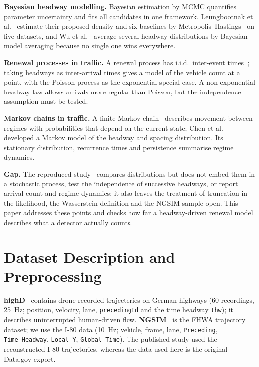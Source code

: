 \documentclass[10pt,a4paper]{article}
\numberwithin{equation}{section}
\begin{document}
\textbf{Bayesian headway modelling.} Bayesian estimation by MCMC quantifies parameter uncertainty and fits all candidates in one framework. Leungbootnak et al.~\cite{leungbootnak} estimate their proposed density and six baselines by Metropolis--Hastings~\cite{hastings1970} on five datasets,
and Wu et al.~\cite{wu2023} average several headway distributions by Bayesian model averaging because no single one wins everywhere.

\textbf{Renewal processes in traffic.} A renewal process has i.i.d.\ inter-event times~\cite{cox1962,ross1996}; taking headways as inter-arrival times gives a model of the vehicle count at a point, with the Poisson process as the exponential special case.
A non-exponential headway law allows arrivals more regular than Poisson, but the independence assumption must be tested.

\textbf{Markov chains in traffic.} A finite Markov chain~\cite{norris1997} describes movement between regimes with probabilities that depend on the current state;
Chen et al.~\cite{chen2010} developed a Markov model of the headway and spacing distribution. Its stationary distribution, recurrence times and persistence summarise regime dynamics.

\textbf{Gap.} The reproduced study~\cite{leungbootnak} compares distributions but does not embed them in a stochastic process, test the independence of successive headways, or report arrival-count and regime dynamics;
it also leaves the treatment of truncation in the likelihood, the Wasserstein definition and the NGSIM sample open. This paper addresses these points and checks how far a headway-driven renewal model describes what a detector actually counts.

\section{Dataset Description and Preprocessing}\label{sec:data}
\textbf{highD}~\cite{krajewski2018} contains drone-recorded trajectories on German highways (60 recordings, 25~Hz; position, velocity, lane, \texttt{precedingId} and the time headway \texttt{thw}); it describes uninterrupted human-driven flow.
\textbf{NGSIM}~\cite{ngsim} is the FHWA trajectory dataset; we use the I-80 data (10~Hz; vehicle, frame, lane, \texttt{Preceding}, \texttt{Time\_Headway}, \texttt{Local\_Y}, \texttt{Global\_Time}).
The published study used the reconstructed I-80 trajectories, whereas the data used here is the original Data.gov export.
\end{document}
